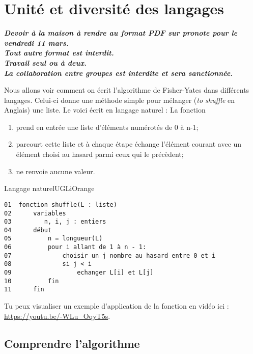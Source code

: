 \documentclass[a4paper,12pt]{book}
\begin{document}
\chapter*{Unité et diversité des langages}

\textit{\textbf{Devoir à la maison à rendre  au format PDF sur pronote pour le vendredi 11 mars.\\
		 Tout autre format est interdit.\\
		 Travail seul ou à deux.\\
		 La collaboration entre groupes est interdite et sera sanctionnée.}\\}


Nous allons voir comment on écrit l'algorithme de Fisher-Yates dans différents langages. Celui-ci donne une méthode simple pour mélanger (\textit{to shuffle} en Anglais) une liste. Le voici écrit en langage naturel :
La fonction
\begin{enumerate}[--]
	\item prend en entrée une liste d'éléments numérotés de 0 à n-1;
    \item parcourt cette liste et à chaque étape échange l'élément courant avec un élément choisi au hasard parmi ceux qui le précèdent;
    \item ne renvoie aucune valeur.
\end{enumerate}

\begin{encadrecolore}{Langage naturel}{UGLiOrange}
\begin{verbatim}
01  fonction shuffle(L : liste)
02      variables
03         n, i, j : entiers
04      début
05          n = longueur(L)
06          pour i allant de 1 à n - 1:
07              choisir un j nombre au hasard entre 0 et i
08              si j < i
09                  echanger L[i] et L[j]
10          fin
11      fin
\end{verbatim}
\end{encadrecolore}

Tu peux visualiser un exemple d'application de la fonction en vidéo ici :\\

\url{https://youtu.be/-WLu_OqyT5s}.

\section{Comprendre l'algorithme}
\end{document}
